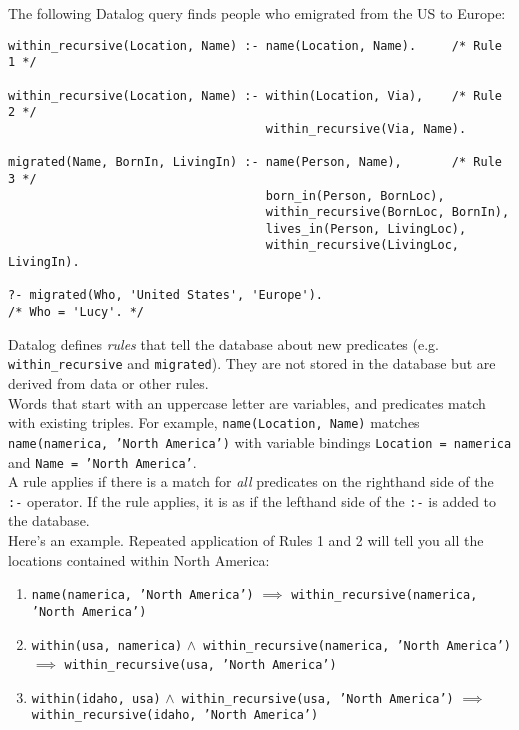 \documentclass[12pt, titlepage]{article}
\begin{document}
The following Datalog query finds people who emigrated from the US to Europe:

\begin{verbatim}
within_recursive(Location, Name) :- name(Location, Name).     /* Rule 1 */

within_recursive(Location, Name) :- within(Location, Via),    /* Rule 2 */
                                    within_recursive(Via, Name).

migrated(Name, BornIn, LivingIn) :- name(Person, Name),       /* Rule 3 */
                                    born_in(Person, BornLoc),
                                    within_recursive(BornLoc, BornIn),
                                    lives_in(Person, LivingLoc),
                                    within_recursive(LivingLoc, LivingIn).

?- migrated(Who, 'United States', 'Europe').
/* Who = 'Lucy'. */
\end{verbatim}

Datalog defines \textit{rules} that tell the database about new predicates (e.g. \texttt{within\_recursive} and \texttt{migrated}). They are not stored in the database but are derived from data or other rules. \\

Words that start with an uppercase letter are variables, and predicates match with existing triples. For example, \texttt{name(Location, Name)} matches \texttt{name(namerica, 'North America')} with variable bindings \texttt{Location = namerica} and \texttt{Name = 'North America'}. \\

A rule applies if there is a match for \textit{all} predicates on the righthand side of the \texttt{:-} operator. If the rule applies, it is as if the lefthand side of the \texttt{:-} is added to the database. \\

Here's an example. Repeated application of Rules 1 and 2 will tell you all the locations contained within North America:

\begin{enumerate}
    \item \texttt{name(namerica, 'North America')} $\implies$ \texttt{within\_recursive(namerica, 'North America')}
    \item \texttt{within(usa, namerica)} $\land$\, \texttt{within\_recursive(namerica, 'North America')} $\implies$ \texttt{within\_recursive(usa, 'North America')}
    \item \texttt{within(idaho, usa)} $\land$\, \texttt{within\_recursive(usa, 'North America')} $\implies$ \texttt{within\_recursive(idaho, 'North America')}
\end{enumerate}
\end{document}
